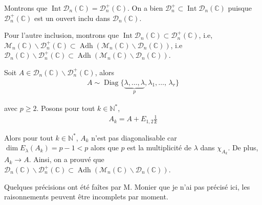 \documentclass{article}
\DeclareMathOperator{\diag}{Diag}
\DeclareMathOperator{\adh}{Adh}
\DeclareMathOperator{\inte}{Int}
\begin{document}
	Montrons que $\inte \mathcal{D}_n(\mathbb{C}) = \mathcal{D}_n^+(\mathbb{C})$. On a bien $\mathcal{D}_n^+\subset \inte\mathcal{D}_n(\mathbb{C})$ puisque $\mathcal{D}_n^+(\mathbb{C})$ est un ouvert inclu dans $\mathcal{D}_n(\mathbb{C})$. 

	Pour l'autre inclusion, montrons que $\inte \mathcal{D}_n(\mathbb{C}) \subset \mathcal{D}_n^+(\mathbb{C})$, i.e, $\mathcal{M}_n(\mathbb{C})\backslash \mathcal{D}_n^+(\mathbb{C}) \subset \adh (\mathcal{M}_n(\mathbb{C})\backslash\mathcal{D}_n(\mathbb{C}))$, i.e $\mathcal{D}_n(\mathbb{C})\backslash\mathcal{D}_n^+(\mathbb{C})\subset \adh (\mathcal{M}_n(\mathbb{C})\backslash\mathcal{D}_n(\mathbb{C}))$. 

	Soit $A\in\mathcal{D}_n(\mathbb{C})\backslash\mathcal{D}_n^+(\mathbb{C})$, alors 
	\begin{align*}
	A \sim \diag\{\underbrace{\lambda, \ldots, \lambda}_{p}, \lambda_1, \ldots,\, \lambda_r\}
	\end{align*}

	avec $p\geq 2$. Posons pour tout $k\in\mathbb{N}^*$, 
	\begin{align*}
		A_k = A + E_{1, 2}\frac{1}{k}
	\end{align*}

	Alors pour tout $k\in\mathbb{N}^*$, $A_k$ n'est pas diagonalisable car $\dim E_{\lambda}(A_k) = p-1 < p$ alors que $p$ est la multiplicité de $\lambda$ dans $\chi_{A_k}$. De plus, $A_k\to A$. Ainsi, on a prouvé que $\mathcal{D}_n(\mathbb{C})\backslash\mathcal{D}_n^+(\mathbb{C}) \subset \adh(\mathcal{M}_n(\mathbb{C})\backslash\mathcal{D}_n(\mathbb{C}))$.

        Quelques précisions ont été faîtes par M. Monier que je n'ai pas précisé ici, les raisonnements peuvent être incomplets par moment.
	
\end{document}
